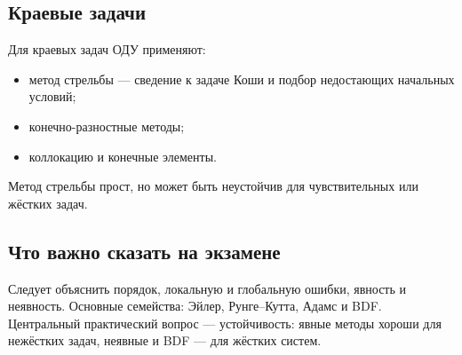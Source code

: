 \subsection{Краевые задачи}

Для краевых задач ОДУ применяют:
\begin{itemize}
    \item метод стрельбы --- сведение к задаче Коши и подбор недостающих
          начальных условий;
    \item конечно-разностные методы;
    \item коллокацию и конечные элементы.
\end{itemize}
Метод стрельбы прост, но может быть неустойчив для чувствительных или жёстких
задач.

\subsection{Что важно сказать на экзамене}

Следует объяснить порядок, локальную и глобальную ошибки, явность и неявность.
Основные семейства: Эйлер, Рунге--Кутта, Адамс и BDF. Центральный практический
вопрос --- устойчивость: явные методы хороши для нежёстких задач, неявные и BDF
--- для жёстких систем.

\newpage